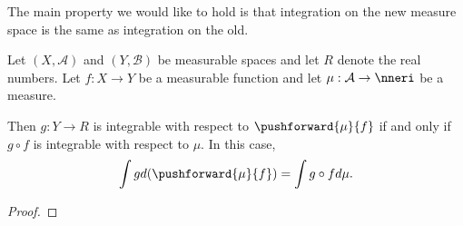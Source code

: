 
The main property
we would like to hold
is that integration
on the new measure space
is the same as integration
on the old.

\begin{prop}
  Let
  $(X, \mathcal{A})$
  and
  $(Y, \mathcal{B})$
  be measurable spaces
  and let $R$ denote
  the real numbers.
  Let $f: X \to Y$ be
  a measurable function
  and let
  $\mu: \mathcal{A} \to \nneri$
  be a measure.

  Then $g: Y \to R$
  is integrable with
  respect to
  $\pushforward{\mu}{f}$
  if and only if
  $g \circ f$
  is integrable with
  respect to
  $\mu$.
  In this case,
  \[
    \int g d(\pushforward{\mu}{f})
    =
    \int g \circ f d\mu.
  \]
  \begin{proof}
  \end{proof}
\end{prop}
\strats
